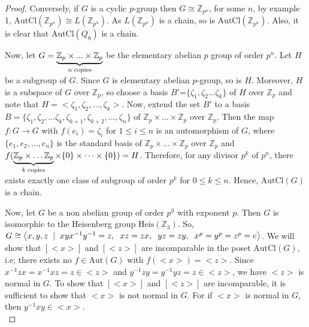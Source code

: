 \documentclass{article}
\theoremstyle{definition}
\begin{document}
\begin{proof}
Conversely, if $G$ is a cyclic $p$-group then $G\cong \mathbb{Z}_{p^n}$, for some $n$, by example 1, $\text{AutCl}(\mathbb{Z}_{p^n})\cong L(\mathbb{Z}_{p^n})$. As $L(\mathbb{Z}_{p^n})$ is a chain, so is $\text{AutCl}(\mathbb{Z}_{p^n})$. Also, it is clear that $\text{AutCl}(Q_8)$ is a chain. \par Now, let $G=\underbrace{\mathbb{Z}_p\times...\times \mathbb{Z}_p}_\textrm{\emph{n} copies}$ be the elementary abelian $p$ group of order $p^n$. Let $H$ be a subgroup of $G$. Since $G$ is elementary abelian $p$-group, so is $H$. Moreover, $H$ is a subspace of $G$ over $\mathbb{Z}_p$, so choose a basis $B'$=$\{\zeta_1,\zeta_2\dots \zeta_k\}$ of $H$ over $\mathbb{Z}_p$ and note that $H=\bigl<\zeta_{1},\zeta_{2},\dots,\zeta_{k}\bigr>$. Now, extend the set $B'$ to a basis $B=\{\zeta_1,\zeta_2,\dots \zeta_k, \zeta_{k+1},\zeta_{k+2},\dots,\zeta_n\}$ of $\mathbb{Z}_p\times\dots \times \mathbb{Z}_p$ over $\mathbb{Z}_p$. Then the map $f:G \to G$ with $f(e_i)=\zeta_i$ for $1\le i\le n$ is an automorphism of $G$, where $\{e_1,e_2,\dots,e_n\}$ is the standard basis of $\mathbb{Z}_p\times \dots \times \mathbb{Z}_p$ over $\mathbb{Z}_p$ and $f(\underbrace{\mathbb{Z}_p\times\dots \mathbb{Z}_p}_\textrm{\emph{k} copies}\times\{0\}\times \dots\times\{0\})=H$. Therefore, for any divisor $p^k$ of $p^n$, there exists exactly one class of subgroup of order $p^k$ for $0\le k\le n$. Hence, $\text{AutCl}(G)$ is a chain. \par
Now, let $G$ be a non abelian group of order $p^3$ with exponent $p$. Then $G$ is isomorphic to the Heisenberg group $\text{Heis}(\mathbb{Z}_3)$. So, $G\cong \bigl<x,y,z \hspace{0.2cm}|\hspace{0.2cm} xyx^{-1}y^{-1}=z, \hspace{0.2cm}xz=zx, \hspace{0.2cm} yz=zy, \hspace{0.2cm}x^p=y^p=z^p=e \bigr>$. We will show that $[\bigl<x\bigr>]$ and $[\bigl<z\bigr>]$ are incomparable in the poset $\text{AutCl}(G)$, i.e; there exists no $f\in \text{Aut}(G)$ with $f(\bigl<x\bigr>)=\bigl<z\bigr>$. Since $x^{-1}zx=x^{-1}xz=z\in \bigl<z\bigr>$ and $y^{-1}zy=y^{-1}yz=z\in \bigl<z\bigr>$, we have $\bigl<z\bigr>$ is normal in $G$. To show that $[\bigl<x\bigr>]$ and $[\bigl<z\bigr>]$ are incomparable, it is sufficient to show that $\bigl<x\bigr>$ is not normal in $G$. For if $\bigl<x\bigr>$ is normal in $G$, then $y^{-1}xy\in \bigl<x\bigr>$.\vspace{0.2cm}\\

\end{proof}
\end{document}
